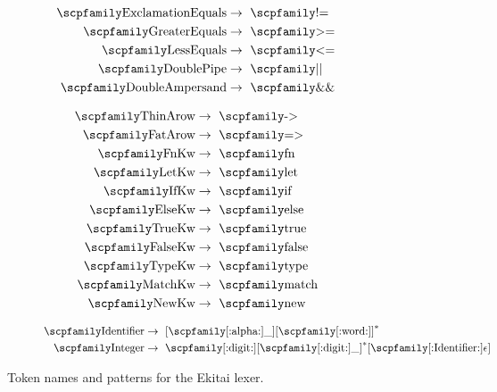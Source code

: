\documentclass[
  oneside,
  english,
  coorientadorbanca,
  noabntexcite
]{ufsc-thesis-rn46-2019}
\newcommand{\code}[1]{\text{\scpfamily\setlength\spaceskip{0.35em}#1}}
\begin{document}
\begin{figure}[ht]
\begin{subfigure}[b]{0.3\textwidth}
\begin{minipage}{\textwidth}
\begin{align*}
        \code{ExclamationEquals} & \rightarrow \ \code{!=}   \\
        \code{GreaterEquals}     & \rightarrow \ \code{>=}   \\
        \code{LessEquals}        & \rightarrow \ \code{<=}   \\
        \code{DoublePipe}        & \rightarrow \ \code{||}   \\
        \code{DoubleAmpersand}   & \rightarrow \ \code{\&\&}
      \end{align*}
    \end{minipage}
  \end{subfigure}
  \begin{subfigure}[b]{0.3\textwidth}
    \small
    \begin{minipage}{\textwidth}
      \begin{align*}
        \code{ThinArow} & \rightarrow \ \code{->}    \\
        \code{FatArow}  & \rightarrow \ \code{=>}    \\
        \code{FnKw}     & \rightarrow \ \code{fn}    \\
        \code{LetKw}    & \rightarrow \ \code{let}   \\
        \code{IfKw}     & \rightarrow \ \code{if}    \\
        \code{ElseKw}   & \rightarrow \ \code{else}  \\
        \code{TrueKw}   & \rightarrow \ \code{true}  \\
        \code{FalseKw}  & \rightarrow \ \code{false} \\
        \code{TypeKw}   & \rightarrow \ \code{type}  \\
        \code{MatchKw}  & \rightarrow \ \code{match} \\
        \code{NewKw}    & \rightarrow \ \code{new}
      \end{align*}
    \end{minipage}
  \end{subfigure}
  \begin{subfigure}[b]{\textwidth}
    \small
    \begin{minipage}{\textwidth}
      \begin{align*}
        \code{Identifier} & \rightarrow \ [\code{[:alpha:]\_}]{[\code{[:word:]}]}^* \\
        \code{Integer}    & \rightarrow \
        \code{[:digit:]}{[\code{[:digit:]\_}]}^*[\code{[:Identifier:]}\epsilon]
      \end{align*}
    \end{minipage}
  \end{subfigure}
  \caption{
    Token names and patterns for the Ekitai lexer.
  }\label{fig:ekitai_tokens}
\end{figure}
\end{document}
